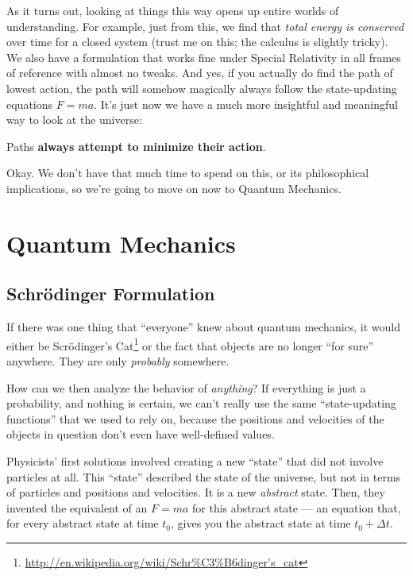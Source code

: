 \documentclass[]{article}
\renewcommand{\href}[2]{#2\footnote{\url{#1}}}
\begin{document}
As it turns out, looking at things this way opens up entire worlds of
understanding. For example, just from this, we find that \emph{total energy is
conserved} over time for a closed system (trust me on this; the calculus is
slightly tricky). We also have a formulation that works fine under Special
Relativity in all frames of reference with almost no tweaks. And yes, if you
actually do find the path of lowest action, the path will somehow magically
always follow the state-updating equations \(F = m a\). It's just now we have a
much more insightful and meaningful way to look at the universe:

Paths \textbf{always attempt to minimize their action}.

Okay. We don't have that much time to spend on this, or its philosophical
implications, so we're going to move on now to Quantum Mechanics.

\hypertarget{quantum-mechanics}{%
\section{Quantum Mechanics}\label{quantum-mechanics}}

\hypertarget{schruxf6dinger-formulation}{%
\subsection{Schrödinger Formulation}\label{schruxf6dinger-formulation}}

If there was one thing that ``everyone'' knew about quantum mechanics, it would
either be
\href{http://en.wikipedia.org/wiki/Schr\%C3\%B6dinger's_cat}{Scrödinger's Cat}
or the fact that objects are no longer ``for sure'' anywhere. They are only
\emph{probably} somewhere.

How can we then analyze the behavior of \emph{anything}? If everything is just a
probability, and nothing is certain, we can't really use the same
``state-updating functions'' that we used to rely on, because the positions and
velocities of the objects in question don't even have well-defined values.

Physicists' first solutions involved creating a new ``state'' that did not
involve particles at all. This ``state'' described the state of the universe,
but not in terms of particles and positions and velocities. It is a new
\emph{abstract} state. Then, they invented the equivalent of an \(F = m a\) for
this abstract state --- an equation that, for every abstract state at time
\(t_0\), gives you the abstract state at time \(t_0 + \Delta t\).
\end{document}
